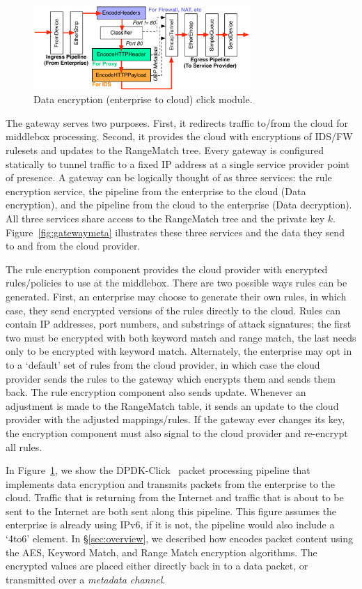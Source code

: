 \begin{figure}[t]
  \centering
  \includegraphics[width=3.25in]{fig/gatewaydiag}
  \caption[]{\label{fig:gateway} Data encryption (enterprise to cloud) click module.}
\end{figure}

The gateway serves two purposes. First, it redirects traffic to/from the cloud for middlebox processing. Second, it provides the cloud with encryptions of IDS/FW rulesets and updates to the RangeMatch tree.
Every gateway is configured statically to tunnel traffic to a fixed IP address at a single service provider point of presence.
A gateway can be logically thought of as three services: the rule encryption service, the pipeline from the enterprise to the cloud (Data encryption), and the pipeline from the cloud to the enterprise (Data decryption). 
All three services share access to the RangeMatch tree and the private key $k$.
Figure~\ref{fig:gatewaymeta} illustrates  these three services and the data they send to and from the cloud provider.

 The rule encryption component provides the cloud provider with encrypted rules/policies to use at the middlebox. 
There are two possible ways rules can be generated. First, an enterprise may choose to generate their own rules, in which case, they send encrypted versions of the rules directly to the cloud.
Rules can contain IP addresses, port numbers, and substrings of attack signatures; the first two must be encrypted with both keyword match and range match, the last needs only to be encrypted with keyword match.
Alternately, the enterprise may opt in to a `default' set of rules from the cloud provider, in which case the cloud provider sends the rules to the gateway which encrypts them and sends them back.
The rule encryption component also sends update. Whenever an adjustment is made to the RangeMatch table, it sends an update to the cloud provider with the adjusted mappings/rules.
If the gateway ever changes its key, the encryption component must also signal to the cloud provider and re-encrypt all rules.

 In Figure~\ref{fig:gateway}, we show the DPDK-Click~\cite{click} packet processing pipeline that implements data encryption and transmits packets from the enterprise to the cloud.
Traffic that is returning from the Internet and traffic that is about to be sent to the Internet are both sent along this pipeline.
This figure assumes the enterprise is already using IPv6, if it is not, the pipeline would also include a `4to6' element.
In \S\ref{sec:overview}, we described how \sys encodes packet content using the AES, Keyword Match, and Range Match encryption algorithms. 
The encrypted values are placed either directly back in to a data packet, or transmitted over a {\it metadata channel}.

